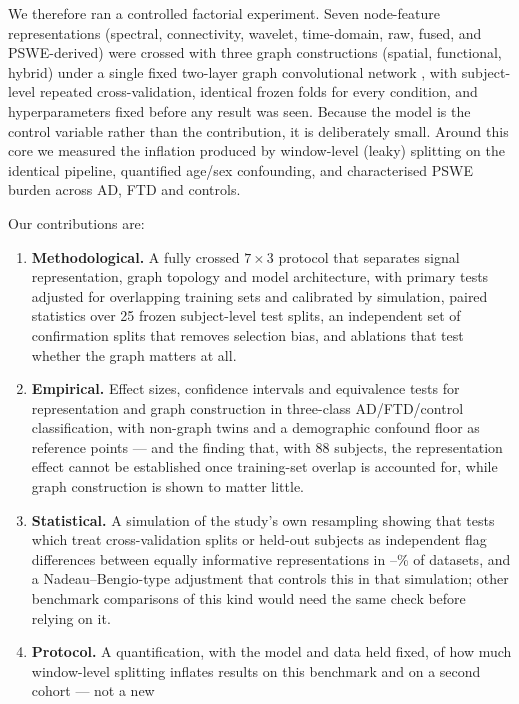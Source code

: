 We therefore ran a controlled factorial experiment. Seven node-feature representations (spectral,
connectivity, wavelet, time-domain, raw, fused, and PSWE-derived) were crossed with three graph
constructions (spatial, functional, hybrid) under a single fixed two-layer graph convolutional
network \cite{F13}, with subject-level repeated cross-validation, identical frozen folds for every
condition, and hyperparameters fixed before any result was seen. Because the model is the control
variable rather than the contribution, it is deliberately small. Around this core we measured the
inflation produced by window-level (leaky) splitting on the identical pipeline, quantified
age/sex confounding, and characterised PSWE burden across AD, FTD and controls.

Our contributions are:
\begin{enumerate}
  \item \textbf{Methodological.} A fully crossed $7\times3$ protocol that separates signal
        representation, graph topology and model architecture, with primary tests adjusted for overlapping
        training sets and calibrated by simulation, paired statistics over 25 frozen subject-level test splits, an independent
        set of confirmation splits that removes selection bias, and ablations that test whether the
        graph matters at all.
  \item \textbf{Empirical.} Effect sizes, confidence intervals and equivalence tests for representation
        and graph construction in three-class AD/FTD/control classification, with non-graph twins and
        a demographic confound floor as reference points --- and the finding that, with 88 subjects, the representation effect cannot be established once training-set overlap is accounted for, while graph construction is shown to matter little.
  \item \textbf{Statistical.} A simulation of the study's own resampling showing that tests which treat
        cross-validation splits or held-out subjects as independent flag differences between equally
        informative representations in \simCorrSubjLo--\simNullUncorr\% of datasets, and a
        Nadeau--Bengio-type adjustment that controls this in that simulation; other benchmark comparisons of this kind would need the same check before relying on it.
  \item \textbf{Protocol.} A quantification, with the model and data held fixed, of how much
        window-level splitting inflates results on this benchmark and on a second cohort --- not a new

\end{enumerate}

